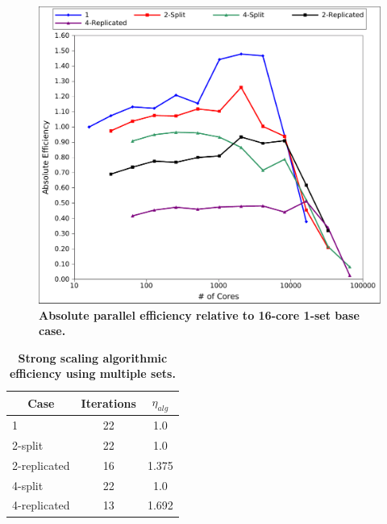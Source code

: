 \begin{figure}[htpb!]
  \begin{center}
    \includegraphics[width=6in]{chapters/parallel_mc/titan_strong_ms_eff.pdf}
  \end{center}
  \caption{\textbf{Absolute parallel efficiency relative to 16-core
      1-set base case.}}
  \label{fig:titan_strong_ms_eff}
\end{figure}

\begin{table}[h!]
  \begin{center}
    \begin{tabular}{lcc}\hline\hline
      \multicolumn{1}{c}{Case}& 
      \multicolumn{1}{c}{Iterations}&
      \multicolumn{1}{c}{$\eta_{alg}$} \\\hline
      1 & 22 & 1.0 \\
      2-split & 22 & 1.0 \\
      2-replicated & 16 & 1.375 \\
      4-split & 22 & 1.0 \\
      4-replicated & 13 & 1.692 \\
      \hline\hline
    \end{tabular}
  \end{center}
  \caption{\textbf{Strong scaling algorithmic efficiency using
      multiple sets.}}
  \label{tab:ms_strong_alg_eff}
\end{table}


